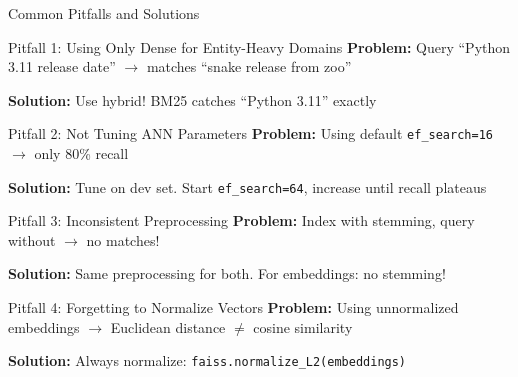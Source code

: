 \documentclass[aspectratio=169]{beamer}
\newif\ifanimated
\newcommand{\cpause}{\ifanimated\pause\fi}
\begin{document}
\begin{frame}[shrink=5]{Common Pitfalls and Solutions}
\begin{alertblock}{Pitfall 1: Using Only Dense for Entity-Heavy Domains}
\textbf{Problem:} Query ``Python 3.11 release date'' $\rightarrow$ matches ``snake release from zoo''

\textbf{Solution:} Use hybrid! BM25 catches ``Python 3.11'' exactly
\end{alertblock}
\cpause

\begin{alertblock}{Pitfall 2: Not Tuning ANN Parameters}
\textbf{Problem:} Using default \texttt{ef\_search=16} $\rightarrow$ only 80\% recall

\textbf{Solution:} Tune on dev set. Start \texttt{ef\_search=64}, increase until recall plateaus
\end{alertblock}
\cpause

\begin{alertblock}{Pitfall 3: Inconsistent Preprocessing}
\textbf{Problem:} Index with stemming, query without $\rightarrow$ no matches!

\textbf{Solution:} Same preprocessing for both. For embeddings: no stemming!
\end{alertblock}
\cpause

\begin{alertblock}{Pitfall 4: Forgetting to Normalize Vectors}
\textbf{Problem:} Using unnormalized embeddings $\rightarrow$ Euclidean distance $\neq$ cosine similarity

\textbf{Solution:} Always normalize: \texttt{faiss.normalize\_L2(embeddings)}
\end{alertblock}
\cpause
\end{frame}
\end{document}
